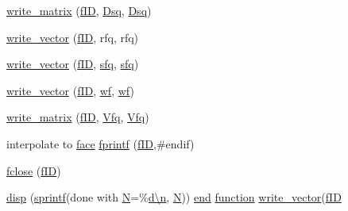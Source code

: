 \begin{DoxyCompactItemize}
\hyperlink{a01014_a0cf70cba53a01ceb0d7754d119c7b6d2}{write\+\_\+matrix} (\hyperlink{a00473_ae0527cbfd56392d5095a691bbf10ba5b}{f\+ID}, \hyperlink{a00473_a90f04ab0b3b4b834efda241ab283fc57}{Dsq}, \textquotesingle{}\hyperlink{a00473_a90f04ab0b3b4b834efda241ab283fc57}{Dsq}\textquotesingle{})
\item 
\hyperlink{a01014_a40e36d8f254d698a6110cf987316b162}{write\+\_\+vector} (\hyperlink{a00473_ae0527cbfd56392d5095a691bbf10ba5b}{f\+ID}, rfq, \textquotesingle{}rfq\textquotesingle{})
\item 
\hyperlink{a01014_a0de2f719e45e6139ac618cecb970c4e4}{write\+\_\+vector} (\hyperlink{a00473_ae0527cbfd56392d5095a691bbf10ba5b}{f\+ID}, \hyperlink{a00473_af5555ce3d578203ae1f6d0731e4f1170}{sfq}, \textquotesingle{}\hyperlink{a00473_af5555ce3d578203ae1f6d0731e4f1170}{sfq}\textquotesingle{})
\item 
\hyperlink{a01014_a440aca7095ed6ac602d8b22d073c8ea1}{write\+\_\+vector} (\hyperlink{a00473_ae0527cbfd56392d5095a691bbf10ba5b}{f\+ID}, \hyperlink{a00473_a7bb9d681a4df47c616b79d82759cd0e6}{wf}, \textquotesingle{}\hyperlink{a00473_a7bb9d681a4df47c616b79d82759cd0e6}{wf}\textquotesingle{})
\item 
\hyperlink{a01014_af2772e6d0019ffff1bf440639d17973e}{write\+\_\+matrix} (\hyperlink{a00473_ae0527cbfd56392d5095a691bbf10ba5b}{f\+ID}, \hyperlink{a01014_ad06233c3cbd809b83fb292471e66fc78}{Vfq}, \textquotesingle{}\hyperlink{a01014_ad06233c3cbd809b83fb292471e66fc78}{Vfq}\textquotesingle{})
\item 
interpolate to \hyperlink{a00611_ac4ec0037ba529da25bf084669a45f60c}{face} \hyperlink{a01014_a57eae7ff361b57d6f8a4375d341ee34e}{fprintf} (\hyperlink{a00473_ae0527cbfd56392d5095a691bbf10ba5b}{f\+ID},\textquotesingle{}\#endif\textquotesingle{})
\item 
\hyperlink{a01014_a355ed4cdac2a27aa04a6689ac2d7e86e}{fclose} (\hyperlink{a00473_ae0527cbfd56392d5095a691bbf10ba5b}{f\+ID})
\item 
\hyperlink{a01014_a7b5a959e1fa05b85090f4f729b0f9784}{disp} (\hyperlink{a00575_ae6aab5c308faac0fc539cc9c6da9fbd0}{sprintf}(\textquotesingle{}done with \hyperlink{a00473_a5b9c4563028063ee53b517cce9aa701b}{N}=\%\hyperlink{a00623_a781a04ab095280f838ff3eb0e51312e0}{d\textbackslash{}n}\textquotesingle{}, \hyperlink{a00473_a5b9c4563028063ee53b517cce9aa701b}{N})) \hyperlink{a00608_afb358f48b1646c750fb9da6c6585be2b}{end} \hyperlink{a00611_a2420833d971716e9bab41cc9fb3abba1}{function} \hyperlink{a00473_a440aca7095ed6ac602d8b22d073c8ea1}{write\+\_\+vector}(\hyperlink{a00473_ae0527cbfd56392d5095a691bbf10ba5b}{f\+ID}

\end{DoxyCompactItemize}
